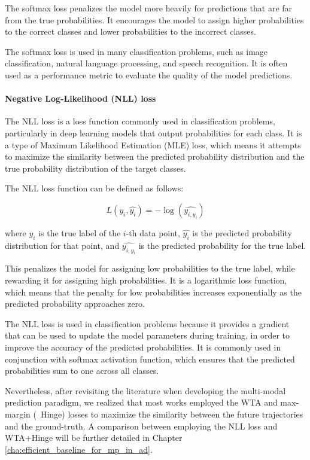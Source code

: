 The softmax loss penalizes the model more heavily for predictions that are far from the true probabilities. It encourages the model to assign higher probabilities to the correct classes and lower probabilities to the incorrect classes.

The softmax loss is used in many classification problems, such as image classification, natural language processing, and speech recognition. It is often used as a performance metric to evaluate the quality of the model predictions.

\paragraph{Negative Log-Likelihood (NLL) loss}
\label{par:3_NLL_loss}

The \acf{NLL} loss is a loss function commonly used in classification problems, particularly in deep learning models that output probabilities for each class. It is a type of Maximum Likelihood Estimation (MLE) loss, which means it attempts to maximize the similarity between the predicted probability distribution and the true probability distribution of the target classes.

The NLL loss function can be defined as follows:

\begin{equation}
	L(y_i, \hat{y_i}) = -\log(\hat{y_{i,y_i}})
\end{equation}

where $y_i$ is the true label of the $i$-th data point, $\hat{y_i}$ is the predicted probability distribution for that point, and $\hat{y_{i,y_i}}$ is the predicted probability for the true label.

This penalizes the model for assigning low probabilities to the true label, while rewarding it for assigning high probabilities. It is a logarithmic loss function, which means that the penalty for low probabilities increases exponentially as the predicted probability approaches zero.

The \ac{NLL} loss is used in classification problems because it provides a gradient that can be used to update the model parameters during training, in order to improve the accuracy of the predicted probabilities. It is commonly used in conjunction with softmax activation function, which ensures that the predicted probabilities sum to one across all classes.

Nevertheless, after revisiting the literature when developing the multi-modal prediction paradigm, we realized that most works employed the \acf{WTA} and max-margin (\aka \ Hinge) losses to maximize the similarity between the future trajectories and the ground-truth. A comparison between employing the \ac{NLL} loss and \ac{WTA}+Hinge will be further detailed in Chapter \ref{cha:efficient_baseline_for_mp_in_ad}.

